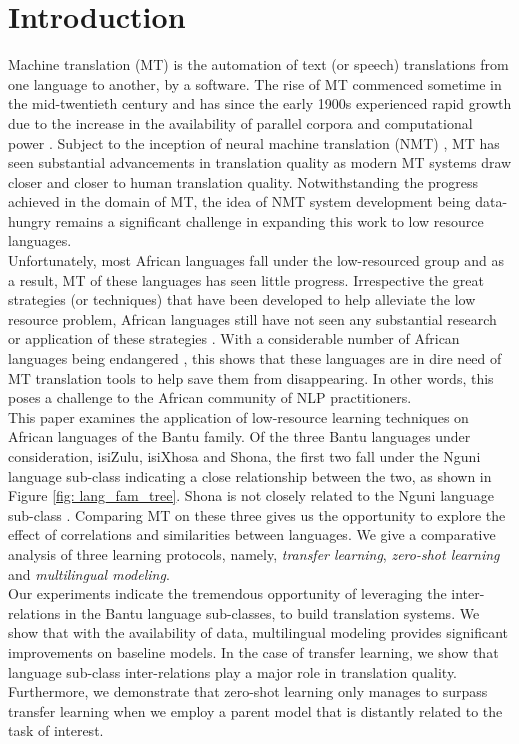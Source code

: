 \documentclass[11pt,a4paper]{article}
\begin{document}
\section{Introduction}
Machine translation (MT) is the automation of text (or speech) translations from one language to another, by a software. The rise of MT commenced sometime in the mid-twentieth century \cite{weaver1955translation} and has since the early 1900s experienced rapid growth due to the increase in the availability of parallel corpora and computational power \cite{marino2006n}. Subject to the inception of neural machine translation (NMT) \citep{sutskever2014sequence, bahdanau2014neural}, MT has seen substantial advancements in translation quality as modern MT systems draw closer and closer to human translation quality. Notwithstanding the progress achieved in the domain of MT, the idea of NMT system development being data-hungry remains a significant challenge in expanding this work to low resource languages.\\ \indent Unfortunately, most African languages fall under the low-resourced group and as a result, MT of these languages has seen little progress. Irrespective the great strategies (or techniques) that have been developed to help alleviate the low resource problem, African languages still have not seen any substantial research or application of these strategies \cite{orife2020masakhane}. With a considerable number of African languages being endangered \cite{ethnologue}, this shows that these languages are in dire need of MT translation tools to help save them from disappearing. In other words, this poses a challenge to the African community of  NLP practitioners.\\ \indent This paper examines the application of low-resource learning techniques on African languages of the Bantu family. Of the three Bantu languages under consideration, isiZulu, isiXhosa and Shona, the first two fall under the Nguni language sub-class indicating a close relationship between the two, as shown in Figure \ref{fig: lang_fam_tree}. Shona is not closely related to the Nguni language sub-class \cite{holden2003spread}. Comparing MT on these three gives us the opportunity to explore the effect of correlations and similarities between languages. We give a comparative analysis of three learning protocols, namely, \emph{transfer learning}, \emph{zero-shot learning} and \emph{multilingual modeling}.\\ \indent Our experiments indicate the tremendous opportunity of leveraging the inter-relations in the Bantu language sub-classes, to build translation systems. We show that with the availability of data, multilingual modeling provides significant improvements on baseline models. In the case of transfer learning, we show that language sub-class inter-relations play a major role in translation quality. Furthermore, we demonstrate that zero-shot learning only manages to surpass transfer learning when we employ a parent model that is distantly related to the task of interest.
\end{document}
